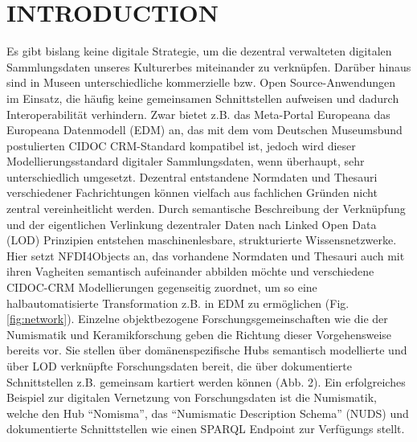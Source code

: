 \documentclass[9pt,academicons]{article}
\begin{document}
\noindent


\section{INTRODUCTION}
Es gibt bislang keine digitale Strategie, um die dezentral verwalteten digitalen Sammlungsdaten unseres Kulturerbes miteinander zu verknüpfen. Darüber hinaus sind in Museen unterschiedliche kommerzielle bzw. Open Source-Anwendungen im Einsatz, die häufig keine gemeinsamen Schnittstellen aufweisen und dadurch Interoperabilität verhindern. Zwar bietet z.B. das Meta-Portal Europeana das Europeana Datenmodell (EDM) an, das mit dem vom Deutschen Museumsbund postulierten CIDOC CRM-Standard kompatibel ist, jedoch wird dieser Modellierungsstandard digitaler Sammlungsdaten, wenn überhaupt, sehr unterschiedlich umgesetzt. Dezentral entstandene Normdaten und Thesauri verschiedener Fachrichtungen können vielfach aus fachlichen Gründen nicht zentral vereinheitlicht werden. Durch semantische Beschreibung der Verknüpfung und der eigentlichen Verlinkung dezentraler Daten nach Linked Open Data (LOD) Prinzipien entstehen maschinenlesbare, strukturierte Wissensnetzwerke. Hier setzt NFDI4Objects an, das vorhandene Normdaten und Thesauri auch mit ihren Vagheiten semantisch aufeinander abbilden möchte und verschiedene CIDOC-CRM Modellierungen gegenseitig zuordnet, um so eine halbautomatisierte Transformation z.B. in EDM zu ermöglichen (Fig. \ref{fig:network}). Einzelne objektbezogene Forschungsgemeinschaften wie die der Numismatik und Keramikforschung geben die Richtung dieser Vorgehensweise bereits vor. Sie stellen über domänenspezifische Hubs semantisch modellierte und über LOD verknüpfte Forschungsdaten bereit, die über dokumentierte Schnittstellen z.B. gemeinsam kartiert werden können (Abb. 2). Ein erfolgreiches Beispiel zur digitalen Vernetzung von Forschungsdaten ist die Numismatik, welche den Hub “Nomisma”, das “Numismatic Description Schema” (NUDS) und dokumentierte Schnittstellen wie einen SPARQL Endpoint zur Verfügungs stellt.\\\\\\
\end{document}
